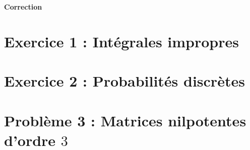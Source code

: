 \documentclass[twoside,french,11pt]{VcCours}
\begin{document}

\begin{center}
\large\bf
Correction
\end{center}
\separationTitre


\section*{Exercice 1 : Intégrales impropres}


\section*{Exercice 2 : Probabilités discrètes}


\section*{Problème 3 : Matrices nilpotentes d'ordre $3$}
\end{document}
